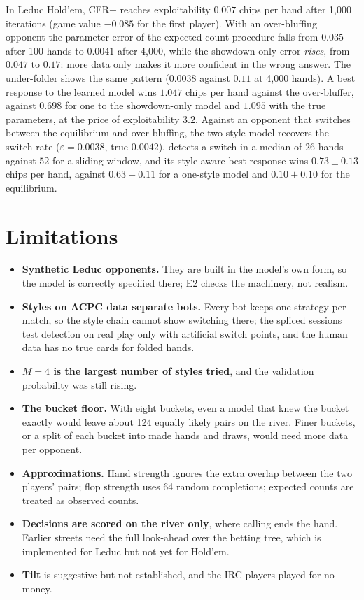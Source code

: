 \documentclass[11pt,a4paper]{article}
\newcommand{\1}{\mathbf{1}}
\begin{document}
In Leduc Hold'em, CFR+ reaches exploitability $0.007$ chips per hand after
1{,}000 iterations (game value $-0.085$ for the first player). With an
over-bluffing opponent the parameter error of the expected-count procedure
falls from $0.035$ after 100 hands to $0.0041$ after 4{,}000, while
the showdown-only error \emph{rises}, from $0.047$ to
$0.17$: more data only makes it more confident in the wrong answer.
The under-folder shows the same pattern ($0.0038$ against
$0.11$ at 4{,}000 hands). A best response to the learned model wins
$1.047$ chips per hand against the over-bluffer, against $0.698$ for one to the
showdown-only model and $1.095$ with the true parameters, at the price of
exploitability $3.2$. Against an opponent that switches between the equilibrium
and over-bluffing, the two-style model recovers the switch rate
($\varepsilon=0.0038$, true $0.0042$), detects a switch in a median of $26$ hands
against $52$ for a sliding window, and its style-aware best response wins
$0.73\pm0.13$ chips per hand, against $0.63\pm0.11$ for a one-style model and
$0.10\pm0.10$ for the equilibrium.

\section{Limitations}

\begin{itemize}
  \item \textbf{Synthetic Leduc opponents.} They are built in the model's own
        form, so the model is correctly specified there; E2 checks the
        machinery, not realism.
  \item \textbf{Styles on ACPC data separate bots.} Every bot keeps one strategy
        per match, so the style chain cannot show switching there; the spliced
        sessions test detection on real play only with artificial switch
        points, and the human data has no true cards for folded hands.
  \item \textbf{$M=4$ is the largest number of styles tried}, and the validation
        probability was still rising.
  \item \textbf{The bucket floor.} With eight buckets, even a model that knew
        the bucket exactly would leave about 124 equally likely pairs on the
        river. Finer buckets, or a split of each bucket into made hands and
        draws, would need more data per opponent.
  \item \textbf{Approximations.} Hand strength ignores the extra overlap between
        the two players' pairs; flop strength uses 64 random completions;
        expected counts are treated as observed counts.
  \item \textbf{Decisions are scored on the river only}, where calling ends the
        hand. Earlier streets need the full look-ahead over the betting tree,
        which is implemented for Leduc but not yet for Hold'em.
  \item \textbf{Tilt} is suggestive but not established, and the IRC players
        played for no money.
\end{itemize}
\end{document}
